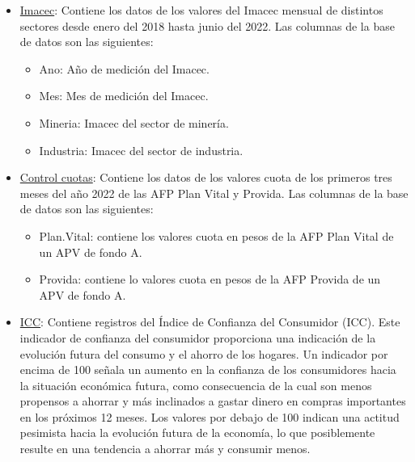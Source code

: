 \documentclass[
  11pt,
]{book}
\providecommand{\tightlist}{%
  \setlength{\itemsep}{0pt}\setlength{\parskip}{0pt}}
\theoremstyle{definition}
\theoremstyle{definition}
\theoremstyle{definition}
\theoremstyle{definition}
\theoremstyle{remark}
\begin{document}
\begin{itemize}
\item
  \label{Imacec}\href{https://raw.githubusercontent.com/Dfranzani/Bases-de-datos-para-cursos/main/2022-2/Estad\%C3\%ADstica\%201/imacec.csv}{Imacec}: Contiene los datos de los valores del Imacec mensual de distintos sectores desde enero del 2018 hasta junio del 2022. Las columnas de la base de datos son las siguientes:

  \begin{itemize}
  \tightlist
  \item
    Ano: Año de medición del Imacec.
  \item
    Mes: Mes de medición del Imacec.
  \item
    Mineria: Imacec del sector de minería.
  \item
    Industria: Imacec del sector de industria.
  \end{itemize}
\item
  \label{Cuotas}\href{https://raw.githubusercontent.com/Dfranzani/Bases-de-datos-para-cursos/main/2023-1/control\%2Bcuotas.csv}{Control cuotas}: Contiene los datos de los valores cuota de los primeros tres meses del año 2022 de las AFP Plan Vital y Provida. Las columnas de la base de datos son las siguientes:

  \begin{itemize}
  \tightlist
  \item
    Plan.Vital: contiene los valores cuota en pesos de la AFP Plan Vital de un APV de fondo A.
  \item
    Provida: contiene lo valores cuota en pesos de la AFP Provida de un APV de fondo A.
  \end{itemize}
\item
  \label{ICC}\href{https://raw.githubusercontent.com/Dfranzani/Bases-de-datos-para-cursos/main/2022-2/Estad\%C3\%ADstica\%202/consumidor.csv}{ICC}: Contiene registros del Índice de Confianza del Consumidor (ICC). Este indicador de confianza del consumidor proporciona una indicación de la evolución futura del consumo y el ahorro de los hogares. Un indicador por encima de 100 señala un aumento en la confianza de los consumidores hacia la situación económica futura, como consecuencia de la cual son menos propensos a ahorrar y más inclinados a gastar dinero en compras importantes en los próximos 12 meses. Los valores por debajo de 100 indican una actitud pesimista hacia la evolución futura de la economía, lo que posiblemente resulte en una tendencia a ahorrar más y consumir menos.
\end{itemize}
\end{document}

